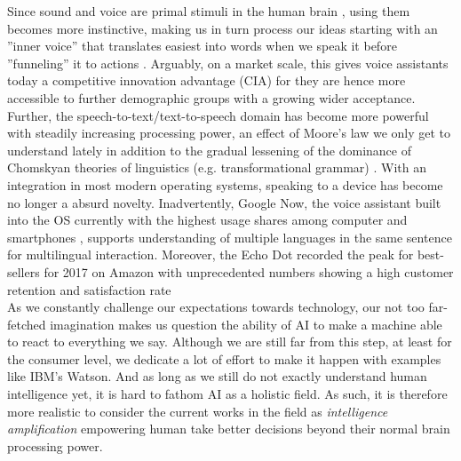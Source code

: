 Since sound and voice are primal stimuli in the human brain \cite{voiceneurons}, using them becomes more instinctive, making us in turn process our ideas starting with an ''inner voice'' that translates easiest into words when we speak it before ''funneling'' it to actions \cite{alexapc18}.
Arguably, on a market scale, this gives voice assistants today a competitive innovation advantage (CIA) for they are hence more accessible to further demographic groups with a growing wider acceptance.\\

Further, the speech-to-text/text-to-speech domain has become more powerful with steadily increasing processing power, an effect of Moore's law we only get to understand lately in addition to the gradual lessening of the dominance of Chomskyan theories of linguistics (e.g. transformational grammar) \cite{wiki:nlp}.
With an integration in most modern operating systems, speaking to a device has become no longer a absurd novelty. 
Inadvertently, Google Now, the voice assistant built into the OS currently with the highest usage shares among computer and smartphones \cite{wiki:gartnerreports}, supports understanding of multiple languages in the same sentence for multilingual interaction.
Moreover, the Echo Dot recorded the peak for best-sellers for 2017 on Amazon with unprecedented numbers showing a high customer retention and satisfaction rate \cite{cnbcAlexa}\\

As we constantly challenge our expectations towards technology, our not too far-fetched imagination makes us question the ability of AI to make a machine able to react to everything we say.
Although we are still far from this step, at least for the consumer level, we dedicate a lot of effort to make it happen with examples like IBM's Watson.
And as long as we still do not exactly understand human intelligence yet, it is hard to fathom AI as a holistic field. As such, it is therefore more realistic to consider the current works in the field as \textit{intelligence amplification} \cite{alexapc18} empowering human take better decisions beyond their normal brain processing power.
\\

